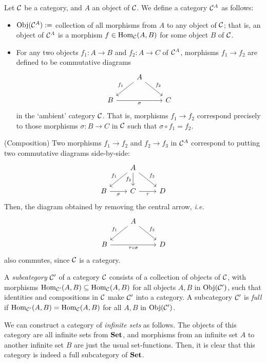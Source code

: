 \begin{xca}
Let $\mathcal{C}$ be a category, and $A$ an object of $\mathcal{C}$. We define a category
$\mathcal{C}^A$ as follows:
\begin{itemize}
    \item $\operatorname{Obj}(\mathcal{C}^A) :=$ collection of all morphisms from $A$ to any
    object of $\mathcal{C}$; that is, an object of $\mathcal{C}^A$ is a morphism $f \in
    \operatorname{Hom}_{\mathcal{C}}(A, B)$ for some object $B$ of $\mathcal{C}$.
    \item For any two objects $f_1: A \to B$ and $f_2: A \to C$ of $\mathcal{C}^A$,
    morphisms $f_1 \to f_2$ are defined to be commutative diagrams
    \[
    \begin{tikzcd}
        & A \arrow[dl, swap, "f_1"]
            \arrow[dr, "f_2"]
            & \\
            B \arrow[rr, swap, "\sigma"]
              & & C
    \end{tikzcd}
    \]
    in the `ambient' category $\mathcal{C}$. That is, morphisms $f_1 \to f_2$
    correspond precisely to those morphisms $\sigma: B \to C$ in $\mathcal{C}$ such
    that $\sigma \circ f_1 = f_2$.
\end{itemize}

(Composition) Two morphisms $f_1 \to f_2$ and $f_2 \to f_3$ in $\mathcal{C}^A$
correspond to putting two commutative diagrams side-by-side:
\[
\begin{tikzcd}
    & A \arrow[dl, swap, "f_1"]
        \arrow[d, swap, "f_2"]
        \arrow[dr, "f_3"]
        & \\
    B \arrow[r, swap, "\sigma"]
      & C \arrow[r, swap, "\tau"]
          & D
\end{tikzcd}
\]
Then, the diagram obtained by removing the central arrow, \emph{i.e.}
\[
\begin{tikzcd}
    & A \arrow[dl, swap, "f_1"]
        \arrow[dr, "f_3"]
        & \\
    B \arrow[rr, swap, "\tau \circ \sigma"]
      & & D
\end{tikzcd}
\]
also commutes, since $\mathcal{C}$ is a category.
\end{xca}

\begin{xca}
A \emph{subcategory} $\mathcal{C}'$ of a category $\mathcal{C}$ consists of a collection
of objects of $\mathcal{C}$, with morphisms $\operatorname{Hom}_{\mathcal{C}'}(A, B) \subseteq
\operatorname{Hom}_{\mathcal{C}}(A, B)$ for all objects $A, B$ in $\operatorname{Obj}(\mathcal{C}')$, such that
identities and compositions in $\mathcal{C}$ make $\mathcal{C}'$ into a category. A
subcategory $\mathcal{C}'$ is \emph{full} if $\operatorname{Hom}_{\mathcal{C}'}(A, B) =
\operatorname{Hom}_{\mathcal{C}}(A, B)$ for all $A, B$ in $\operatorname{Obj}(\mathcal{C}')$.

We can construct a category of \emph{infinite sets} as follows. The objects of
this category are all infinite sets from $\mathbf{Set}$, and morphisms from an
infinite set $A$ to another infinite set $B$ are just the usual set-functions.
Then, it is clear that this category is indeed a full subcategory of
$\mathbf{Set}$.
\end{xca}

